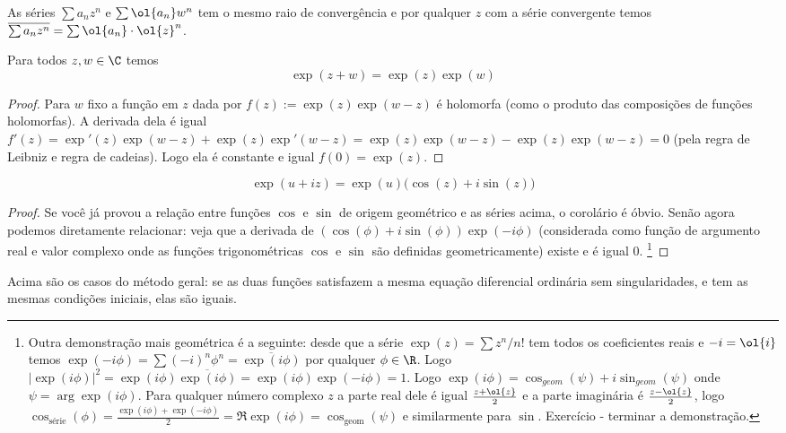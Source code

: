 As séries $\sum a_n z^n$ e $\sum \ol{a_n} w^n$ tem o mesmo raio de convergência e por qualquer $z$ com a série convergente temos
$\overline{\sum a_n z^n} = \sum \ol{a_n} \cdot \ol{z}^n$.

\begin{prop}
Para todos $z,w\in \C$ temos
\begin{equation}
\exp(z+w) = \exp(z) \exp(w)
\end{equation}
\end{prop}
\begin{proof}
Para $w$ fixo a função em $z$ dada por
$f(z) := \exp(z) \exp(w-z)$ é holomorfa (como o produto das composições de funções holomorfas).
A derivada dela é igual $f'(z) = \exp'(z) \exp(w-z) + \exp(z) \exp'(w-z) = \exp(z) \exp(w-z) - \exp(z) \exp(w-z) = 0$
(pela regra de Leibniz e regra de cadeias). Logo ela é constante e igual $f(0) = \exp(z)$.
\end{proof}

\begin{cor}
\begin{equation}
\exp(u+iz) = \exp(u) \big( \cos(z) + i \sin(z) \big)
\end{equation}
\end{cor}
\begin{proof}
Se você já provou a relação entre funções $\cos$ e $\sin$ de origem geométrico e as séries acima,
o corolário é óbvio. Senão agora podemos diretamente relacionar: veja que a derivada de
$(\cos(\phi) + i \sin(\phi)) \exp(-i\phi)$ (considerada como função de argumento real e valor complexo
onde as funções trigonométricas $\cos$ e $\sin$ são definidas geometricamente)
existe e é igual $0$.
\footnote{
Outra demonstração mais geométrica é a seguinte:
desde que a série $\exp(z) = \sum z^n / n!$ tem todos os coeficientes reais e $-i = \ol{i}$ temos
$\exp(-i\phi) = \sum (-i)^n \phi^n = \overline{\exp(i\phi)}$ por qualquer $\phi \in \R$.
Logo $|\exp(i\phi)|^2 = \exp(i\phi) \overline{\exp(i\phi)} = \exp(i\phi) \exp(-i\phi) = 1$.
Logo $\exp(i\phi) = \cos_{geom}(\psi) + i \sin_{geom}(\psi)$ onde $\psi = \arg \exp(i\phi)$.
Para qualquer número complexo $z$ a parte real dele é igual $\frac{z+\ol{z}}2$
e a parte imaginária é $\frac{z-\ol{z}}2$, logo $\cos_\text{série}(\phi) = \frac{\exp(i\phi)+\exp(-i\phi)}2 = \Re \exp(i\phi) = \cos_\text{geom}(\psi)$ e similarmente para $\sin$.
Exercício - terminar a demonstração.
}
\end{proof}

\begin{remark}
Acima são os casos do método geral:
se as duas funções satisfazem a mesma equação diferencial ordinária sem singularidades,
e tem as mesmas condições iniciais, elas são iguais.
\end{remark}


